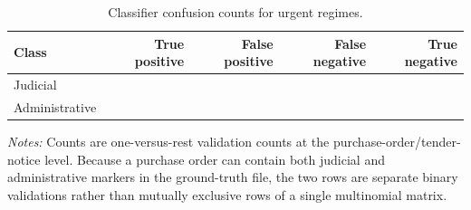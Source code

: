 \begin{table}[ht]
\centering
\caption{Classifier confusion counts for urgent regimes.}
\label{tab:classifier_confusion_v9}
\begin{threeparttable}
\small
\begin{tabular}{lrrrr}
\toprule
Class & True positive & False positive & False negative & True negative \\
\midrule
Judicial & \BPregexJudTP{} & \BPregexJudFP{} & \BPregexJudFN{} & \BPregexJudTN{} \\
Administrative & \BPregexAdmTP{} & \BPregexAdmFP{} & \BPregexAdmFN{} & \BPregexAdmTN{} \\
\bottomrule
\end{tabular}
\begin{tablenotes}[flushleft]\footnotesize
\item \textit{Notes:} Counts are one-versus-rest validation counts at the purchase-order/tender-notice level. Because a purchase order can contain both judicial and administrative markers in the ground-truth file, the two rows are separate binary validations rather than mutually exclusive rows of a single multinomial matrix.
\end{tablenotes}
\end{threeparttable}
\end{table}
